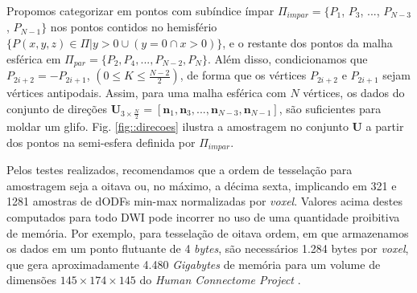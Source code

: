 Propomos categorizar em pontos com subíndice ímpar $\Pi_{impar} = \{P_1$,
$P_3$, ...,
$P_{N-3}$,
$P_{N-1}\}$ nos pontos contidos no hemisfério $\{P(x, y, z) \in \Pi | y > 0 \cup (y = 0 \cap x > 0)\}$, e o restante dos pontos da malha esférica em $\Pi_{par} = \{P_2, P_4, ..., P_{N-2}, P_{N}\}$. Além disso, condicionamos que $P_{2i+2} = -P_{2i+1}$, $(0 \leq K \leq \frac{N-2}{2})$, de forma que os vértices $P_{2i+2}$ e $P_{2i+1}$ sejam vértices antipodais. Assim, para uma malha esférica com $N$ vértices, os dados do conjunto de direções $\mathbf{U}_{3\times \frac{N}{2}} = [
\mathbf{n}_1,
\mathbf{n}_3, ..., 
\mathbf{n}_{N-3},
\mathbf{n}_{N-1}
]$, são suficientes para moldar um glifo. Fig. \ref{fig::direcoes} ilustra a amostragem no conjunto $\mathbf{U}$ a partir dos pontos na semi-esfera definida por $\Pi_{impar}$.

Pelos testes realizados, recomendamos que a ordem de tesselação para amostragem seja a oitava ou, no máximo, a décima sexta, implicando em 321 e 1281 amostras de dODFs min-max normalizadas por \textit{voxel}. Valores acima destes computados para todo DWI pode incorrer no uso de uma quantidade proibitiva de memória. Por exemplo, para tesselação de oitava ordem, em que armazenamos os dados em um ponto flutuante de 4 \textit{bytes}, são necessários 1.284 bytes por \textit{voxel}, que gera aproximadamente 4.480 \textit{Gigabytes} de memória para um volume de dimensões $145 \times 174 \times 145$ do \textit{Human Connectome Project} \cite{essen2012}.




